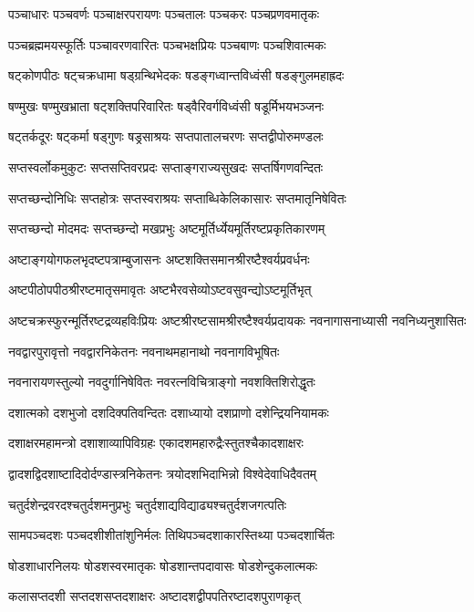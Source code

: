 \twolineshloka
{पञ्चाधारः पञ्चवर्णः पञ्चाक्षरपरायणः}
{पञ्चतालः पञ्चकरः पञ्चप्रणवमातृकः}

\twolineshloka
{पञ्चब्रह्ममयस्फूर्तिः पञ्चावरणवारितः}
{पञ्चभक्षप्रियः पञ्चबाणः पञ्चशिवात्मकः}

\twolineshloka
{षट्कोणपीठः षट्चक्रधामा षड्ग्रन्थिभेदकः}
{षडङ्गध्वान्तविध्वंसी षडङ्गुलमहाह्रदः}

\twolineshloka
{षण्मुखः षण्मुखभ्राता षट्शक्तिपरिवारितः}
{षड्वैरिवर्गविध्वंसी षडूर्मिभयभञ्जनः}

\twolineshloka
{षट्तर्कदूरः षट्कर्मा षड्गुणः षड्रसाश्रयः}
{सप्तपातालचरणः सप्तद्वीपोरुमण्डलः}

\twolineshloka
{सप्तस्वर्लोकमुकुटः सप्तसप्तिवरप्रदः}
{सप्ताङ्गराज्यसुखदः सप्तर्षिगणवन्दितः}

\twolineshloka
{सप्तच्छन्दोनिधिः सप्तहोत्रः सप्तस्वराश्रयः}
{सप्ताब्धिकेलिकासारः सप्तमातृनिषेवितः}

\twolineshloka
{सप्तच्छन्दो मोदमदः सप्तच्छन्दो मखप्रभुः}
{अष्टमूर्तिर्ध्येयमूर्तिरष्टप्रकृतिकारणम्}

\twolineshloka
{अष्टाङ्गयोगफलभृदष्टपत्राम्बुजासनः}
{अष्टशक्तिसमानश्रीरष्टैश्वर्यप्रवर्धनः}

\twolineshloka
{अष्टपीठोपपीठश्रीरष्टमातृसमावृतः}
{अष्टभैरवसेव्योऽष्टवसुवन्द्योऽष्टमूर्तिभृत्}

\threelineshloka
{अष्टचक्रस्फुरन्मूर्तिरष्टद्रव्यहविःप्रियः}
{अष्टश्रीरष्टसामश्रीरष्टैश्वर्यप्रदायकः}
{नवनागासनाध्यासी नवनिध्यनुशासितः}

\twolineshloka
{नवद्वारपुरावृत्तो नवद्वारनिकेतनः}
{नवनाथमहानाथो नवनागविभूषितः}

\twolineshloka
{नवनारायणस्तुल्यो नवदुर्गानिषेवितः}
{नवरत्नविचित्राङ्गो नवशक्तिशिरोद्धृतः}

\twolineshloka
{दशात्मको दशभुजो दशदिक्पतिवन्दितः}
{दशाध्यायो दशप्राणो दशेन्द्रियनियामकः}

\twolineshloka
{दशाक्षरमहामन्त्रो दशाशाव्यापिविग्रहः}
{एकादशमहारुद्रैःस्तुतश्चैकादशाक्षरः}

\twolineshloka
{द्वादशद्विदशाष्टादिदोर्दण्डास्त्रनिकेतनः}
{त्रयोदशभिदाभिन्नो विश्वेदेवाधिदैवतम्}

\twolineshloka
{चतुर्दशेन्द्रवरदश्चतुर्दशमनुप्रभुः}
{चतुर्दशाद्यविद्याढ्यश्चतुर्दशजगत्पतिः}

\twolineshloka
{सामपञ्चदशः पञ्चदशीशीतांशुनिर्मलः}
{तिथिपञ्चदशाकारस्तिथ्या पञ्चदशार्चितः}

\twolineshloka
{षोडशाधारनिलयः षोडशस्वरमातृकः}
{षोडशान्तपदावासः षोडशेन्दुकलात्मकः}

\twolineshloka
{कलासप्तदशी सप्तदशसप्तदशाक्षरः}
{अष्टादशद्वीपपतिरष्टादशपुराणकृत्}

